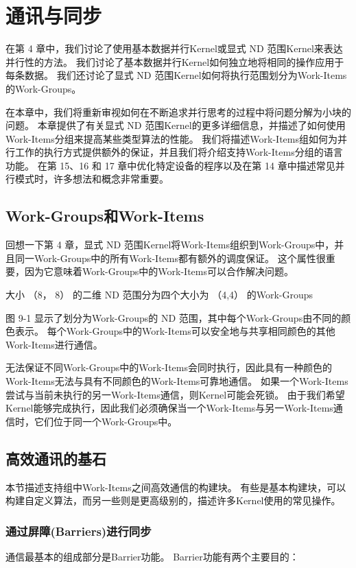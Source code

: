 \section{通讯与同步}
在第 4 章中，我们讨论了使用基本数据并行Kernel或显式 ND 范围Kernel来表达并行性的方法。 
我们讨论了基本数据并行Kernel如何独立地将相同的操作应用于每条数据。 
我们还讨论了显式 ND 范围Kernel如何将执行范围划分为Work-Items的Work-Groups。

在本章中，我们将重新审视如何在不断追求并行思考的过程中将问题分解为小块的问题。 
本章提供了有关显式 ND 范围Kernel的更多详细信息，并描述了如何使用Work-Items分组来提高某些类型算法的性能。 
我们将描述Work-Items组如何为并行工作的执行方式提供额外的保证，并且我们将介绍支持Work-Items分组的语言功能。 
在第 15、16 和 17 章中优化特定设备的程序以及在第 14 章中描述常见并行模式时，许多想法和概念非常重要。

\subsection{Work-Groups和Work-Items}
回想一下第 4 章，显式 ND 范围Kernel将Work-Items组织到Work-Groups中，并且同一Work-Groups中的所有Work-Items都有额外的调度保证。 
这个属性很重要，因为它意味着Work-Groups中的Work-Items可以合作解决问题。

{\color{red} 大小 （8， 8） 的二维 ND 范围分为四个大小为 （4,4） 的Work-Groups}

图 9-1 显示了划分为Work-Groups的 ND 范围，其中每个Work-Groups由不同的颜色表示。 
每个Work-Groups中的Work-Items可以安全地与共享相同颜色的其他Work-Items进行通信。

无法保证不同Work-Groups中的Work-Items会同时执行，因此具有一种颜色的Work-Items无法与具有不同颜色的Work-Items可靠地通信。 
如果一个Work-Items尝试与当前未执行的另一Work-Items通信，则Kernel可能会死锁。 
由于我们希望Kernel能够完成执行，因此我们必须确保当一个Work-Items与另一Work-Items通信时，它们位于同一个Work-Groups中。

\subsection{高效通讯的基石}
本节描述支持组中Work-Items之间高效通信的构建块。 
有些是基本构建块，可以构建自定义算法，而另一些则是更高级别的，描述许多Kernel使用的常见操作。

\subsubsection{通过屏障(Barriers)进行同步}
通信最基本的组成部分是Barrier功能。 Barrier功能有两个主要目的：

